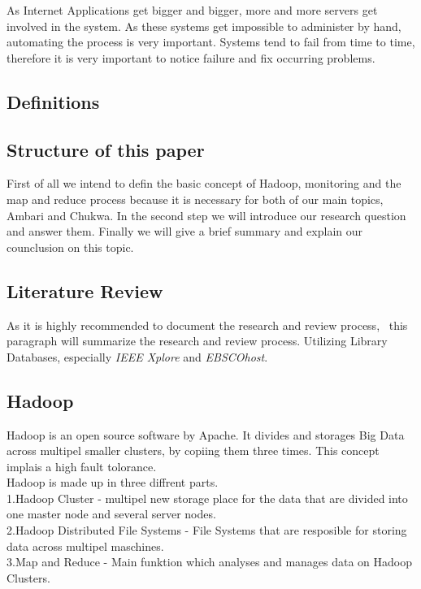 As Internet Applications get bigger and bigger, more and more servers get involved in the system. As these systems get impossible to administer by hand, automating the process is very important. Systems tend to fail from time to time, therefore it is very important to notice failure and fix occurring problems.


\subsection{Definitions}

\subsection{Structure of this paper}
First of all we intend to defin the basic concept of Hadoop, monitoring and the map and reduce process because it is necessary for both of our main topics, Ambari and Chukwa. In the second step we will introduce our research question and answer them. Finally we will give a brief summary and explain our counclusion on this topic.

\subsection{Literature Review}
	As it is highly recommended to document the research and review process,~\cite{brocke09} this paragraph will summarize the research and review process.
	Utilizing Library Databases, especially \emph{IEEE Xplore} and \emph{EBSCOhost}.
	
\subsection{Hadoop}
Hadoop is an open source software by Apache. It divides and storages Big Data across multipel smaller clusters, by copiing them three times. This concept implais a high fault tolorance. 
 \\
 Hadoop is made up in three diffrent parts. 
  \\
  1.Hadoop Cluster - multipel new storage place for the data that are divided into one master node and several server nodes.
  \\
  2.Hadoop Distributed File Systems - File Systems that are resposible for storing data across multipel maschines.
  \\
  3.Map and Reduce - Main funktion which analyses and manages data on Hadoop Clusters.
